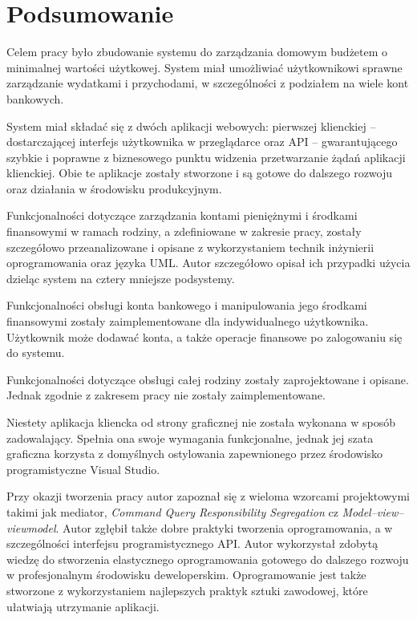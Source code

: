 \chapter{Podsumowanie}
\label{chap:podsumowanie}

Celem pracy było zbudowanie systemu do zarządzania domowym budżetem o minimalnej wartości użytkowej. System miał umożliwiać użytkownikowi sprawne zarządzanie wydatkami i przychodami, w szczególności z podziałem na wiele kont bankowych.

System miał składać się z dwóch aplikacji webowych: pierwszej klienckiej -- dostarczającej interfejs użytkownika w przeglądarce oraz API -- gwarantującego szybkie i poprawne z biznesowego punktu widzenia  przetwarzanie żądań aplikacji klienckiej. Obie te aplikacje zostały stworzone i są gotowe do dalszego rozwoju oraz działania w środowisku produkcyjnym. 

Funkcjonalności dotyczące zarządzania kontami pieniężnymi i środkami finansowymi w ramach rodziny, a zdefiniowane w zakresie pracy, zostały szczegółowo przeanalizowane i opisane z wykorzystaniem technik inżynierii oprogramowania oraz języka UML. Autor szczegółowo opisał ich przypadki użycia dzieląc system na cztery mniejsze podsystemy.

Funkcjonalności obsługi konta bankowego i manipulowania jego środkami finansowymi zostały zaimplementowane dla indywidualnego użytkownika. Użytkownik może dodawać konta, a także operacje finansowe po zalogowaniu się do systemu.

Funkcjonalności dotyczące obsługi całej rodziny zostały zaprojektowane i opisane. Jednak zgodnie z zakresem pracy nie zostały zaimplementowane.

Niestety aplikacja kliencka od strony graficznej nie została wykonana w sposób zadowalający. Spełnia ona swoje wymagania funkcjonalne, jednak jej szata graficzna korzysta z domyślnych ostylowania zapewnionego przez środowisko programistyczne Visual Studio.

Przy okazji tworzenia pracy autor zapoznał się z wieloma wzorcami projektowymi takimi jak mediator, \emph{Command Query Responsibility Segregation} cz \emph{Model–view–viewmodel}. Autor zgłębił także dobre praktyki tworzenia oprogramowania, a w szczególności interfejsu programistycznego API. Autor wykorzystał zdobytą wiedzę do stworzenia elastycznego oprogramowania gotowego do dalszego rozwoju w profesjonalnym środowisku deweloperskim. Oprogramowanie jest także stworzone z wykorzystaniem najlepszych praktyk sztuki zawodowej, które ułatwiają utrzymanie aplikacji.

